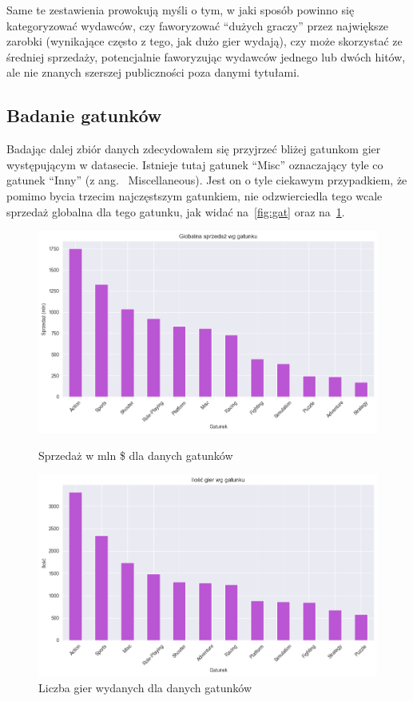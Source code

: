 \documentclass[11pt]{article}
\begin{document}
Same te zestawienia prowokują myśli o tym, w jaki sposób powinno się kategoryzować wydawców, czy faworyzować ``dużych graczy''
przez największe zarobki (wynikające często z tego, jak dużo gier wydają), czy może skorzystać ze średniej sprzedaży,
potencjalnie faworyzując wydawców jednego lub dwóch hitów, ale nie znanych szerszej publiczności poza danymi tytułami.

\subsection{Badanie gatunków}\label{subsec:badanie-gatunkow}
Badając dalej zbiór danych zdecydowałem się przyjrzeć bliżej gatunkom gier występującym w datasecie.
Istnieje tutaj gatunek ``Misc'' oznaczający tyle co gatunek ``Inny'' (z ang.~ Miscellaneous).
Jest on o tyle ciekawym przypadkiem, że pomimo bycia trzecim najczęstszym gatunkiem, nie odzwierciedla tego wcale sprzedaż globalna dla tego gatunku, jak widać na~\ref{fig:gat} oraz na~\ref{fig:gat2}.

\begin{figure}[H]
    \centering
    \begin{minipage}[t]{0.48\linewidth}
        \centering
        \includegraphics[width=\linewidth]{figures/gatunek-sprzedaz}
        \caption{Sprzedaż w mln \$ dla danych gatunków}
        \label{fig:gat}
    \end{minipage}
    \hfill
    \begin{minipage}[t]{0.48\linewidth}
        \centering
        \includegraphics[width=\linewidth]{figures/gatunek-ilosc}
        \caption{Liczba gier wydanych dla danych gatunków}
        \label{fig:gat2}
    \end{minipage}
\end{figure}
\end{document}
